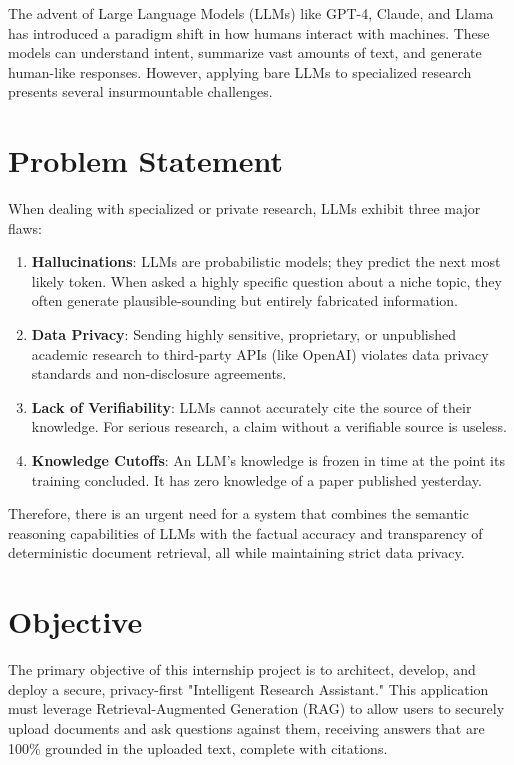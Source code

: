 \documentclass[12pt, a4paper]{report}
\begin{document}
The advent of Large Language Models (LLMs) like GPT-4, Claude, and Llama has introduced a paradigm shift in how humans interact with machines. These models can understand intent, summarize vast amounts of text, and generate human-like responses. However, applying bare LLMs to specialized research presents several insurmountable challenges.

\section{Problem Statement}
When dealing with specialized or private research, LLMs exhibit three major flaws:
\begin{enumerate}
    \item \textbf{Hallucinations}: LLMs are probabilistic models; they predict the next most likely token. When asked a highly specific question about a niche topic, they often generate plausible-sounding but entirely fabricated information.
    \item \textbf{Data Privacy}: Sending highly sensitive, proprietary, or unpublished academic research to third-party APIs (like OpenAI) violates data privacy standards and non-disclosure agreements.
    \item \textbf{Lack of Verifiability}: LLMs cannot accurately cite the source of their knowledge. For serious research, a claim without a verifiable source is useless.
    \item \textbf{Knowledge Cutoffs}: An LLM's knowledge is frozen in time at the point its training concluded. It has zero knowledge of a paper published yesterday.
\end{enumerate}
Therefore, there is an urgent need for a system that combines the semantic reasoning capabilities of LLMs with the factual accuracy and transparency of deterministic document retrieval, all while maintaining strict data privacy.

\section{Objective}
The primary objective of this internship project is to architect, develop, and deploy a secure, privacy-first "Intelligent Research Assistant." This application must leverage Retrieval-Augmented Generation (RAG) to allow users to securely upload documents and ask questions against them, receiving answers that are 100\% grounded in the uploaded text, complete with citations.
\end{document}
